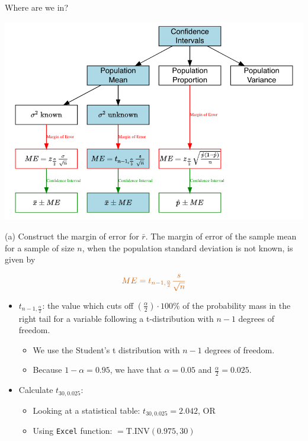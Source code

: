 \documentclass[
  11pt,
  ignorenonframetext,
]{beamer}
\providecommand{\tightlist}{%
  \setlength{\itemsep}{0pt}\setlength{\parskip}{0pt}}
\begin{document}
\begin{frame}{Where are we in?}
\protect\hypertarget{where-are-we-in-1}{}
\begin{center}\includegraphics[width=0.9\linewidth]{pictures/CI_BriefReview-Ex2} \end{center}
\end{frame}

\begin{frame}[fragile]{(a) Construct the margin of error for
\(\bar{r}\).}
\protect\hypertarget{a-construct-the-margin-of-error-for-barr.}{}
The margin of error of the sample mean for a sample of size \(n\), when
the population standard deviation is not known, is given by

\[
\color{red}{ME = t_{n-1, \frac{\alpha}{2}} \frac{s}{\sqrt{n}}}
\]

\begin{itemize}
\tightlist
\item
  \(t_{n-1, \frac{\alpha}{2}}\): the value which cuts off
  \((\frac{\alpha}{2})\cdot 100\%\) of the probability mass in the right
  tail for a variable following a t-distribution with \(n-1\) degrees of
  freedom.

  \begin{itemize}
  \tightlist
  \item
    We use the Student's t distribution with \(n-1\) degrees of freedom.
  \item
    Because \(1-\alpha=0.95\), we have that \(\alpha=0.05\) and
    \(\frac{\alpha}{2}=0.025\).
  \end{itemize}
\item
  Calculate \(t_{30, 0.025}\):

  \begin{itemize}
  \tightlist
  \item
    Looking at a statistical table: \(t_{30, 0.025} = 2.042\), OR
  \item
    Using \texttt{Excel} function: \(=\text{T.INV}(0.975,30)\)
  \end{itemize}
\end{itemize}
\end{frame}
\end{document}

